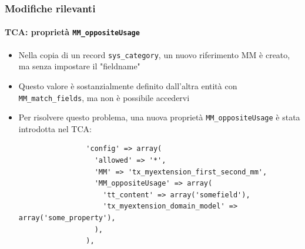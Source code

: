 \begin{frame}[fragile]
	\frametitle{Modifiche rilevanti}
	\framesubtitle{TCA: proprietà \texttt{MM\_oppositeUsage}}

	\lstset{
		basicstyle=\tiny\ttfamily
	}

	\begin{itemize}
		\item Nella copia di un record \texttt{sys\_category}, un nuovo riferimento MM è creato, ma senza impostare il "fieldname"
		\item Questo valore è sostanzialmente definito dall'altra entità con \texttt{MM\_match\_fields}, ma non è possibile accedervi
		\item Per risolvere questo problema, una nuova proprietà \texttt{MM\_oppositeUsage} è stata introdotta nel TCA:

			\begin{lstlisting}
				'config' => array(
				  'allowed' => '*',
				  'MM' => 'tx_myextension_first_second_mm',
				  'MM_oppositeUsage' => array(
				    'tt_content' => array('somefield'),
				    'tx_myextension_domain_model' => array('some_property'),
				  ),
				),
			\end{lstlisting}

	\end{itemize}

\end{frame}


